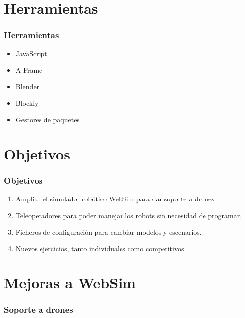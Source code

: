 \documentclass[xcolor={table}]{beamer}
\begin{document}
	\section{Herramientas}
		\begin{frame}
			\frametitle{Herramientas}
           	\begin{itemize}
			    \item JavaScript
			     \item A-Frame
			    \item Blender
			    \item Blockly
			    \item Gestores de paquetes
			\end{itemize}
		\end{frame}
		
	\section{Objetivos}
		\begin{frame}
			\frametitle{Objetivos}
			\begin{enumerate}
				\item Ampliar el simulador robótico WebSim para dar soporte a drones
				\item Teleoperadores para poder manejar los robots sin necesidad de programar.
				\item Ficheros de configuración para cambiar modelos y escenarios.
				\item Nuevos ejercicios, tanto individuales como competitivos
			\end{enumerate}
		\end{frame}

	\section{Mejoras a WebSim}
		\begin{frame}
			\frametitle{Soporte a drones}
		\end{frame}
\end{document}
